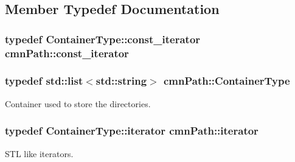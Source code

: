 \subsection{Member Typedef Documentation}
\hypertarget{classcmn_path_a9e313220d7a856280a1dff97d73c61f8}{
\subsubsection[{const\-\_\-iterator}]{\setlength{\rightskip}{0pt plus 5cm}typedef Container\-Type\-::const\-\_\-iterator {\bf cmn\-Path\-::const\-\_\-iterator}}}\label{classcmn_path_a9e313220d7a856280a1dff97d73c61f8}
\hypertarget{classcmn_path_aa5870e72f7b99998f414021e28fe80a9}{
\subsubsection[{Container\-Type}]{\setlength{\rightskip}{0pt plus 5cm}typedef std\-::list$<$std\-::string$>$ {\bf cmn\-Path\-::\-Container\-Type}}}\label{classcmn_path_aa5870e72f7b99998f414021e28fe80a9}
Container used to store the directories. \hypertarget{classcmn_path_a58a2a202a8ed8c65abb90be592724341}{
\subsubsection[{iterator}]{\setlength{\rightskip}{0pt plus 5cm}typedef Container\-Type\-::iterator {\bf cmn\-Path\-::iterator}}}\label{classcmn_path_a58a2a202a8ed8c65abb90be592724341}
S\-T\-L like iterators. 

